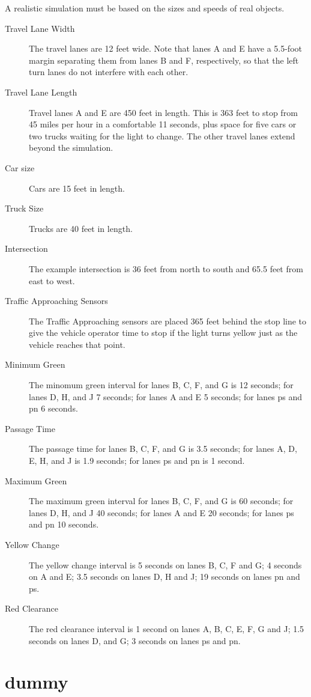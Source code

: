 \documentclass[letterpaper,twoside]{article}
\begin{document}
A realistic simulation must be based on the sizes and speeds of real objects.

\begin{description}
\item[Travel Lane Width]{The travel lanes are 12 feet wide.  Note that lanes
  A and E have a 5.5-foot margin separating them from lanes B and F,
  respectively, so that the left turn lanes do not interfere with each other.}
\item[Travel Lane Length]{Travel lanes A and E are 450 feet in length.
  This is 363 feet to stop from 45 miles per hour in a comfortable 11 seconds,
  plus space for five cars or two trucks waiting for the light to change.
  The other travel lanes extend beyond the simulation.}
\item[Car size]{Cars are 15 feet in length.}
\item[Truck Size]{Trucks are 40 feet in length.}
\item[Intersection]{The example intersection is 36 feet from north to south
  and 65.5 feet from east to west.}
\item[Traffic Approaching Sensors]{The Traffic Approaching sensors are placed
  365 feet behind the stop line to give the vehicle operator time to stop
  if the light turns yellow just as the vehicle reaches that point.}
\item[Minimum Green]{The minomum green interval for lanes B, C, F, and G
  is 12 seconds; for lanes D, H, and J 7 seconds; for lanes A and E 5 seconds;
  for lanes ps and pn 6 seconds.}
\item[Passage Time]{The passage time for lanes B, C, F, and G is 3.5
  seconds; for lanes A, D, E, H, and J is 1.9 seconds;
  for lanes ps and pn is 1 second.}
\item[Maximum Green]{The maximum green interval for lanes B, C, F, and G
  is 60 seconds; for lanes D, H, and J 40 seconds; for lanes A and E
  20 seconds; for lanes ps and pn 10 seconds.}
\item[Yellow Change]{The yellow change interval is 5 seconds on lanes
  B, C, F and G; 4 seconds on A and E; 3.5 seconds on lanes D, H and J;
  19 seconds on lanes pn and ps.}
\item[Red Clearance]{The red clearance interval is 1 second on lanes A, B, C,
  E, F, G and J; 1.5 seconds on lanes D, and G; 3 seconds on lanes ps and pn.}
\end{description}

\section{dummy}
\citep{Stephenson20160404}
\end{document}
